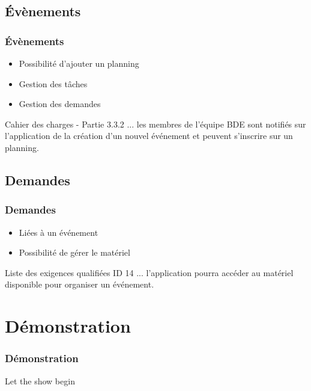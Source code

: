 \documentclass[handout]{beamer}
\begin{document}
	\subsection{Évènements}
	\begin{frame}
		\frametitle{Évènements}

		\begin{itemize}
			\item Possibilité d'ajouter un planning
			\item Gestion des tâches
			\item Gestion des demandes
		\end{itemize}

		\begin{exampleblock}{Cahier des charges - Partie 3.3.2}
			... les membres de l'équipe BDE sont notifiés sur l'application de la création d'un nouvel événement et peuvent s'inscrire sur un planning.
		\end{exampleblock}
	\end{frame}

	\subsection{Demandes}
	\begin{frame}
		\frametitle{Demandes}

		\begin{itemize}
			\item Liées à un événement
			\item Possibilité de gérer le matériel
		\end{itemize}

		\begin{exampleblock}{Liste des exigences qualifiées  ID 14}
			... l'application pourra accéder au matériel disponible pour organiser un événement.
		\end{exampleblock}
	\end{frame}

	\section{Démonstration}
	 \begin{frame}
                \frametitle{Démonstration}

                \begin{center}
                        \huge{Let the show begin}
                \end{center}
        \end{frame}

\end{document}
